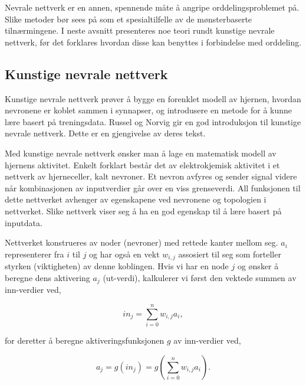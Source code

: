 \begin{center}
{\huge\color{gray!50}{\decofourleft}}
\end{center}

Nevrale nettverk er en annen, spennende måte å angripe orddelingsproblemet på. Slike metoder bør sees på som et spesialtilfelle av de mønsterbaserte tilnærmingene. I neste avsnitt presenteres noe teori rundt kunstige nevrale nettverk, før det forklares hvordan disse kan benyttes i forbindelse med orddeling.

\subsection{Kunstige nevrale nettverk}
\label{sec:nevrale-nettverk}

Kunstige nevrale nettverk prøver å bygge en forenklet modell av hjernen, hvordan nevronene er koblet sammen i synnapser, og introdusere en metode for å kunne lære basert på treningsdata. Russel og Norvig \cite{Russel2010} gir en god introduksjon til kunstige nevrale nettverk. Dette er en gjengivelse av deres tekst.

\begin{center}
{\huge\color{gray!50}{\decofourleft}}
\end{center}

Med kunstige nevrale nettverk ønsker man å lage en matematisk modell av hjernens aktivitet. Enkelt forklart består det av elektrokjemisk aktivitet i et nettverk av hjerneceller, kalt nevroner. Et nevron avfyres og sender signal videre når kombinasjonen av inputverdier går over en viss grenseverdi. All funksjonen til dette nettverket avhenger av egenskapene ved nevronene og topologien i nettverket. Slike nettverk viser seg å ha en god egenskap til å lære basert på inputdata.

Nettverket konstrueres av noder (nevroner) med rettede kanter mellom seg. $a_i$ representerer  fra $i$ til $j$ og har også en vekt $w_{i,j}$ assosiert til seg som forteller styrken (viktigheten) av denne koblingen. Hvis vi har en node $j$ og ønsker å beregne dens aktivering $a_j$ (ut-verdi), kalkulerer vi først den vektede summen av inn-verdier ved,

\begin{equation}
in_{j} = \sum_{i=0}^n w_{i,j}a_{i},
\end{equation}

for deretter å beregne aktiveringsfunksjonen $g$ av inn-verdier ved,

\begin{equation}
a_{j} = g(in_{j}) = g(\sum_{i=0}^n w_{i,j}a_{i}).
\end{equation}

